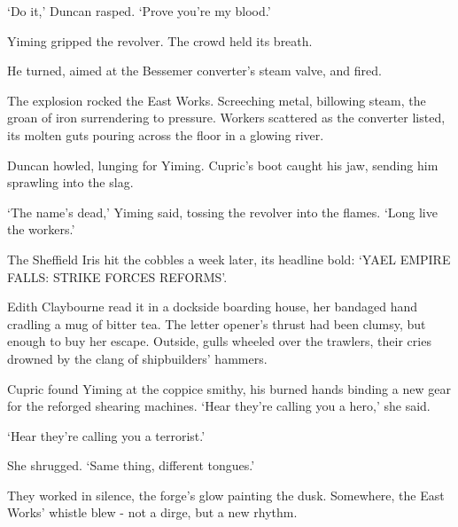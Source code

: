 `Do it,' Duncan rasped. `Prove you're my blood.'

Yiming gripped the revolver. The crowd held its breath.

He turned, aimed at the Bessemer converter's steam valve, and fired.

The explosion rocked the East Works. Screeching metal, billowing steam, the groan of iron surrendering to pressure. Workers scattered as the converter listed, its molten guts pouring across the floor in a glowing river.

Duncan howled, lunging for Yiming. Cupric's boot caught his jaw, sending him sprawling into the slag.

`The name's dead,' Yiming said, tossing the revolver into the flames. `Long live the workers.'

The Sheffield Iris hit the cobbles a week later, its headline bold: `YAEL EMPIRE FALLS: STRIKE FORCES REFORMS'.

Edith Claybourne read it in a dockside boarding house, her bandaged hand cradling a mug of bitter tea. The letter opener's thrust had been clumsy, but enough to buy her escape. Outside, gulls wheeled over the trawlers, their cries drowned by the clang of shipbuilders' hammers.

Cupric found Yiming at the coppice smithy, his burned hands binding a new gear for the reforged shearing machines. `Hear they're calling you a hero,' she said.

`Hear they're calling you a terrorist.'

She shrugged. `Same thing, different tongues.'

They worked in silence, the forge's glow painting the dusk. Somewhere, the East Works' whistle blew - not a dirge, but a new rhythm.
